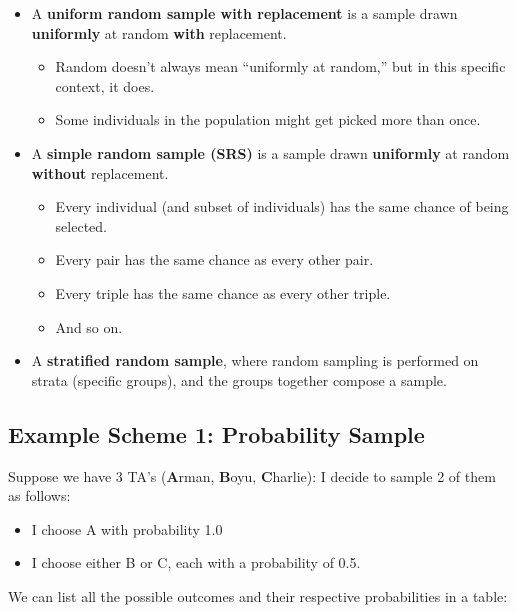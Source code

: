\documentclass[
  letterpaper,
  DIV=11,
  numbers=noendperiod]{scrreprt}
\providecommand{\tightlist}{%
  \setlength{\itemsep}{0pt}\setlength{\parskip}{0pt}}\usepackage{longtable,booktabs,array}
\begin{document}
\begin{itemize}
\tightlist
\item
  A \textbf{uniform random sample with replacement} is a sample drawn
  \textbf{uniformly} at random \textbf{with} replacement.

  \begin{itemize}
  \tightlist
  \item
    Random doesn't always mean ``uniformly at random,'' but in this
    specific context, it does.
  \item
    Some individuals in the population might get picked more than once.
  \end{itemize}
\item
  A \textbf{simple random sample (SRS)} is a sample drawn
  \textbf{uniformly} at random \textbf{without} replacement.

  \begin{itemize}
  \tightlist
  \item
    Every individual (and subset of individuals) has the same chance of
    being selected.
  \item
    Every pair has the same chance as every other pair.
  \item
    Every triple has the same chance as every other triple.
  \item
    And so on.
  \end{itemize}
\item
  A \textbf{stratified random sample}, where random sampling is
  performed on strata (specific groups), and the groups together compose
  a sample.
\end{itemize}

\subsection{Example Scheme 1: Probability
Sample}\label{example-scheme-1-probability-sample}

Suppose we have 3 TA's (\textbf{A}rman, \textbf{B}oyu,
\textbf{C}harlie): I decide to sample 2 of them as follows:

\begin{itemize}
\tightlist
\item
  I choose A with probability 1.0
\item
  I choose either B or C, each with a probability of 0.5.
\end{itemize}

We can list all the possible outcomes and their respective probabilities
in a table:
\end{document}
